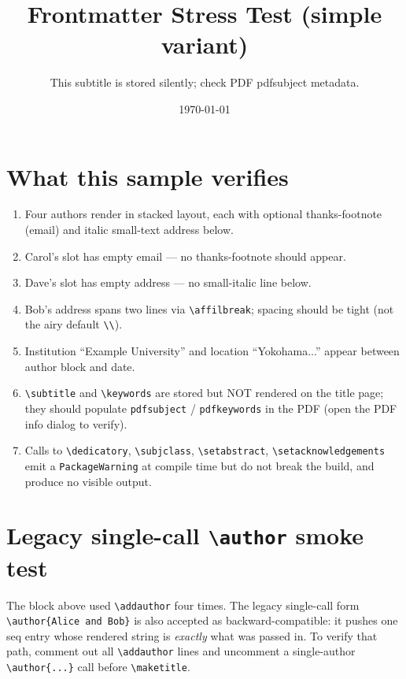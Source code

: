 \documentclass{e_class_article}
\title{Frontmatter Stress Test (simple variant)}
\subtitle{This subtitle is stored silently; check PDF pdfsubject metadata.}
\date{\today}
\begin{document}
\maketitle

\section{What this sample verifies}

\begin{enumerate}
  \item Four authors render in stacked layout, each with optional
        thanks-footnote (email) and italic small-text address below.
  \item Carol's slot has empty email — no thanks-footnote should appear.
  \item Dave's slot has empty address — no small-italic line below.
  \item Bob's address spans two lines via \verb|\affilbreak|; spacing
        should be tight (not the airy default \verb|\\|).
  \item Institution ``Example University'' and location ``Yokohama...''
        appear between author block and date.
  \item \verb|\subtitle| and \verb|\keywords| are stored but NOT
        rendered on the title page; they should populate
        \texttt{pdfsubject} / \texttt{pdfkeywords} in the PDF (open the
        PDF info dialog to verify).
  \item Calls to \verb|\dedicatory|, \verb|\subjclass|,
        \verb|\setabstract|, \verb|\setacknowledgements| emit a
        \texttt{PackageWarning} at compile time but do not break the
        build, and produce no visible output.
\end{enumerate}

\section{Legacy single-call \texttt{\textbackslash author} smoke test}

The block above used \verb|\addauthor| four times. The legacy
single-call form \verb|\author{Alice and Bob}| is also accepted as
backward-compatible: it pushes one seq entry whose rendered string is
\textit{exactly} what was passed in. To verify that path, comment out
all \verb|\addauthor| lines and uncomment a single-author
\verb|\author{...}| call before \verb|\maketitle|.
\end{document}
